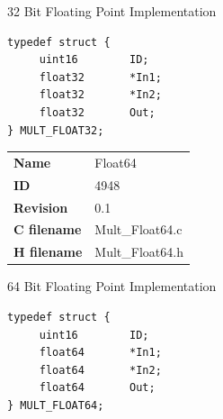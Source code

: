 32 Bit Floating Point Implementation

\begin{lstlisting}
typedef struct {
     uint16        ID;
     float32       *In1;
     float32       *In2;
     float32       Out;
} MULT_FLOAT32;
\end{lstlisting}

\ifdefined \AddTestReports
{}
\fi
{}
\nopagebreak[0]
\begin{tabular}{l l}
\textbf{Name} & Float64 \tabularnewline
\textbf{ID} & 4948 \tabularnewline
\textbf{Revision} & 0.1 \tabularnewline
\textbf{C filename} & Mult\_Float64.c \tabularnewline
\textbf{H filename} & Mult\_Float64.h \tabularnewline
\end{tabular}
\vspace{1ex}

64 Bit Floating Point Implementation

\begin{lstlisting}
typedef struct {
     uint16        ID;
     float64       *In1;
     float64       *In2;
     float64       Out;
} MULT_FLOAT64;
\end{lstlisting}

\ifdefined \AddTestReports
{}
\fi
